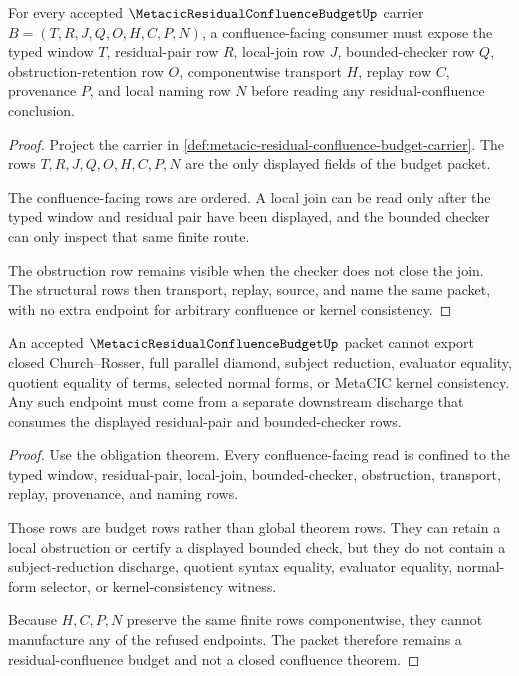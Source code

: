 \begin{theorem}
\label{thm:metacic-residual-confluence-budget-obligations}
For every accepted $\MetacicResidualConfluenceBudgetUp$ carrier $B=(T,R,J,Q,O,H,C,P,N)$, a confluence-facing consumer must expose the typed window $T$, residual-pair row $R$, local-join row $J$, bounded-checker row $Q$, obstruction-retention row $O$, componentwise transport $H$, replay row $C$, provenance $P$, and local naming row $N$ before reading any residual-confluence conclusion.
\end{theorem}
\begin{proof}
Project the carrier in \autoref{def:metacic-residual-confluence-budget-carrier}. The rows $T,R,J,Q,O,H,C,P,N$ are the only displayed fields of the budget packet.

The confluence-facing rows are ordered. A local join can be read only after the typed window and residual pair have been displayed, and the bounded checker can only inspect that same finite route.

The obstruction row remains visible when the checker does not close the join. The structural rows then transport, replay, source, and name the same packet, with no extra endpoint for arbitrary confluence or kernel consistency.
\end{proof}

\begin{theorem}
\label{thm:metacic-residual-confluence-budget-nonescape}
An accepted $\MetacicResidualConfluenceBudgetUp$ packet cannot export closed Church--Rosser, full parallel diamond, subject reduction, evaluator equality, quotient equality of terms, selected normal forms, or MetaCIC kernel consistency. Any such endpoint must come from a separate downstream discharge that consumes the displayed residual-pair and bounded-checker rows.
\end{theorem}
\begin{proof}
Use the obligation theorem. Every confluence-facing read is confined to the typed window, residual-pair, local-join, bounded-checker, obstruction, transport, replay, provenance, and naming rows.

Those rows are budget rows rather than global theorem rows. They can retain a local obstruction or certify a displayed bounded check, but they do not contain a subject-reduction discharge, quotient syntax equality, evaluator equality, normal-form selector, or kernel-consistency witness.

Because $H,C,P,N$ preserve the same finite rows componentwise, they cannot manufacture any of the refused endpoints. The packet therefore remains a residual-confluence budget and not a closed confluence theorem.
\end{proof}

